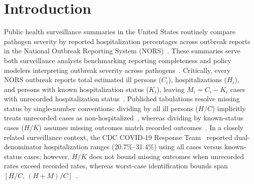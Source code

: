 \section{Introduction}\label{sec:intro}

Public health surveillance summaries in the United States routinely compare pathogen severity by reported hospitalization percentages across outbreak reports in the National Outbreak Reporting System (NORS)~\cite{hall2013acute,deweymattia2018surveillance,wikswo2022enteric,cdcsurveillance2019}. These summaries serve both surveillance analysts benchmarking reporting completeness and policy modelers interpreting outbreak severity across pathogens~\cite{white2022foodborne,tack2021shiga,simpson2022analysing}. Critically, every NORS outbreak reports total estimated ill persons ($C_i$), hospitalizations ($H_i$), and persons with known hospitalization status ($K_i$), leaving $M_i = C_i - K_i$ cases with unrecorded hospitalization status~\cite{cdc2014norsguidance}. Published tabulations resolve missing status by single-number conventions: dividing by all ill persons ($H/C$) implicitly treats unrecorded cases as non-hospitalized~\cite{heiman2015escherichia,tack2021shiga,cdcsurveillance2019}, whereas dividing by known-status cases ($H/K$) assumes missing outcomes match recorded outcomes~\cite{burke2019norovirus,wikswo2022enteric}. In a closely related surveillance context, the CDC COVID-19 Response Team~\cite{cdc2020severe} reported dual-denominator hospitalization ranges (20.7\%--31.4\%) using all cases versus known-status cases; however, $H/K$ does not bound missing outcomes when unrecorded rates exceed recorded rates, whereas worst-case identification bounds span $[H/C,\, (H+M)/C]$~\cite{manski1989anatomy,horowitz2000nonparametric}.

